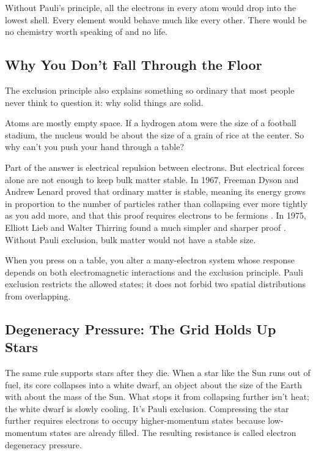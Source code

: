 Without Pauli's principle, all the electrons in every atom would drop into the lowest shell. Every element would behave much like every other. There would be no chemistry worth speaking of and no life.

\subsection{Why You Don't Fall Through the Floor}

The exclusion principle also explains something so ordinary that most people never think to question it: why solid things are solid.

Atoms are mostly empty space. If a hydrogen atom were the size of a football stadium, the nucleus would be about the size of a grain of rice at the center. So why can't you push your hand through a table?

Part of the answer is electrical repulsion between electrons. But electrical forces alone are not enough to keep bulk matter stable. In 1967, Freeman Dyson and Andrew Lenard proved that ordinary matter is stable, meaning its energy grows in proportion to the number of particles rather than collapsing ever more tightly as you add more, and that this proof requires electrons to be fermions \cite{dysonlenard1967}. In 1975, Elliott Lieb and Walter Thirring found a much simpler and sharper proof \cite{liebthirring1975}. Without Pauli exclusion, bulk matter would not have a stable size.

When you press on a table, you alter a many-electron system whose response depends on both electromagnetic interactions and the exclusion principle. Pauli exclusion restricts the allowed states; it does not forbid two spatial distributions from overlapping.

\subsection{Degeneracy Pressure: The Grid Holds Up Stars}

The same rule supports stars after they die. When a star like the Sun runs out of fuel, its core collapses into a white dwarf, an object about the size of the Earth with about the mass of the Sun. What stops it from collapsing further isn't heat; the white dwarf is slowly cooling. It's Pauli exclusion. Compressing the star further requires electrons to occupy higher-momentum states because low-momentum states are already filled. The resulting resistance is called electron degeneracy pressure.

